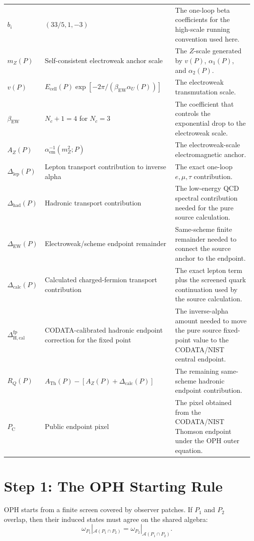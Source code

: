 \documentclass[11pt]{article}
\theoremstyle{remark}
\newcommand{\A}{\mathcal A}
\newcommand{\ATh}{A_{\mathrm{Th}}}
\newcommand{\AZ}{A_Z}
\newcommand{\Ppub}{P_{\mathrm C}}
\newcommand{\Rq}{R_Q}
\newcommand{\Dcalc}{\Delta_{\mathrm{calc}}}
\newcommand{\Dcalib}{\Delta_{\mathrm{H,cal}}}
\newcommand{\Dlep}{\Delta_{\mathrm{lep}}}
\newcommand{\Dhad}{\Delta_{\mathrm{had}}}
\newcommand{\DEW}{\Delta_{\mathrm{EW}}}
\newcommand{\Nc}{N_c}
\begin{document}
\begin{longtable}{@{}L{0.20\textwidth}L{0.32\textwidth}L{0.38\textwidth}@{}}
\(b_i\) & \((33/5,1,-3)\) & The one-loop beta coefficients for the high-scale running convention used here. \\
\(m_Z(P)\) & Self-consistent electroweak anchor scale & The \(Z\)-scale generated by \(v(P)\), \(\alpha_1(P)\), and \(\alpha_2(P)\). \\
\(v(P)\) & \(E_{\mathrm{cell}}(P)\exp[-2\pi/(\beta_{\mathrm{EW}}\alpha_U(P))]\) & The electroweak transmutation scale. \\
\(\beta_{\mathrm{EW}}\) & \(\Nc+1=4\) for \(\Nc=3\) & The coefficient that controls the exponential drop to the electroweak scale. \\
\(\AZ(P)\) & \(\alpha_{\mathrm{em}}^{-1}(m_Z^2;P)\) & The electroweak-scale electromagnetic anchor. \\
\(\Dlep(P)\) & Lepton transport contribution to inverse alpha & The exact one-loop \(e,\mu,\tau\) contribution. \\
\(\Dhad(P)\) & Hadronic transport contribution & The low-energy QCD spectral contribution needed for the pure source calculation. \\
\(\DEW(P)\) & Electroweak/scheme endpoint remainder & Same-scheme finite remainder needed to connect the source anchor to the endpoint. \\
\(\Dcalc(P)\) & Calculated charged-fermion transport contribution & The exact lepton term plus the screened quark continuation used by the source calculation. \\
\(\Dcalib^{\mathrm{fp}}\) & CODATA-calibrated hadronic endpoint correction for the fixed point & The inverse-alpha amount needed to move the pure source fixed-point value to the CODATA/NIST central endpoint. \\
\(\Rq(P)\) & \(\ATh(P)-[\AZ(P)+\Dcalc(P)]\) & The remaining same-scheme hadronic endpoint contribution. \\
\(\Ppub\) & Public endpoint pixel & The pixel obtained from the CODATA/NIST Thomson endpoint under the OPH outer equation. \\
\bottomrule
\end{longtable}

\section{Step 1: The OPH Starting Rule}

OPH starts from a finite screen covered by observer patches. If \(P_1\) and \(P_2\) overlap, then their induced states must agree on the shared algebra:
\begin{equation}
\omega_{P_1}|_{\A(P_1\cap P_2)}
=
\omega_{P_2}|_{\A(P_1\cap P_2)}.
\label{eq:overlap}
\end{equation}
\end{document}
